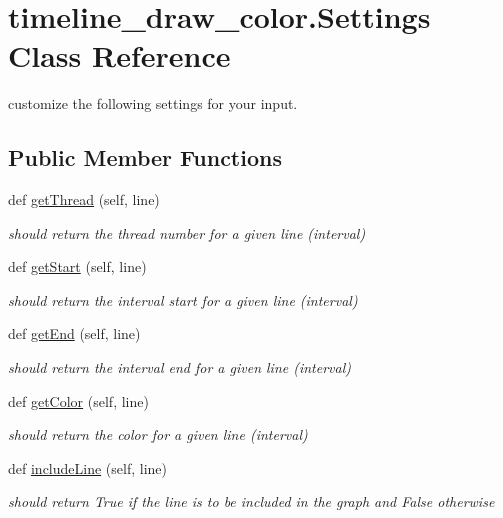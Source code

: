 \hypertarget{classtimeline__draw__color_1_1Settings}{}\section{timeline\+\_\+draw\+\_\+color.\+Settings Class Reference}
\label{classtimeline__draw__color_1_1Settings}


customize the following settings for your input.  


\subsection*{Public Member Functions}
\begin{DoxyCompactItemize}
\item 
def \hyperlink{classtimeline__draw__color_1_1Settings_a0eecbfc1a6cbe1fde41e2b90aa438efc}{get\+Thread} (self, line)
\begin{DoxyCompactList}\small\item\em should return the thread number for a given line (interval) \end{DoxyCompactList}\item 
def \hyperlink{classtimeline__draw__color_1_1Settings_a2ab1436494c5f59f36cead263189aacf}{get\+Start} (self, line)
\begin{DoxyCompactList}\small\item\em should return the interval start for a given line (interval) \end{DoxyCompactList}\item 
def \hyperlink{classtimeline__draw__color_1_1Settings_ab413e00996b5a20cec72774f031c5655}{get\+End} (self, line)
\begin{DoxyCompactList}\small\item\em should return the interval end for a given line (interval) \end{DoxyCompactList}\item 
def \hyperlink{classtimeline__draw__color_1_1Settings_a8391566e3f9b345fe61d8132f31dd546}{get\+Color} (self, line)
\begin{DoxyCompactList}\small\item\em should return the color for a given line (interval) \end{DoxyCompactList}\item 
def \hyperlink{classtimeline__draw__color_1_1Settings_abc0017e43efda88d737383cfbcfb402d}{include\+Line} (self, line)
\begin{DoxyCompactList}\small\item\em should return True if the line is to be included in the graph and False otherwise \end{DoxyCompactList}\end{DoxyCompactItemize}
